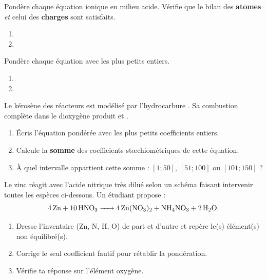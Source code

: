 \documentclass[11pt,a4paper]{article}
\begin{document}
\begin{exo}
Pondère chaque équation ionique en milieu acide. Vérifie que le bilan des \textbf{atomes} \emph{et}
celui des \textbf{charges} sont satisfaits.
\begin{enumerate}[label=\alph*)]
  \item {}
  \item {}
\end{enumerate}
\end{exo}

\begin{exo}
Pondère chaque équation avec les plus petits entiers.
\begin{enumerate}[label=\alph*)]
  \item {}
  \item {}
\end{enumerate}
\end{exo}

\begin{exo}
Le kérosène des réacteurs est modélisé par l'hydrocarbure . Sa combustion complète dans le
dioxygène produit  et .
\begin{enumerate}[label=\alph*)]
  \item Écris l'équation pondérée avec les plus petits coefficients entiers.
  \item Calcule la \textbf{somme} des coefficients stœchiométriques de cette équation.
  \item À quel intervalle appartient cette somme : $[1;50]$, $[51;100]$ ou $[101;150]$ ?
\end{enumerate}
\end{exo}

\begin{exo}
Le zinc réagit avec l'acide nitrique très dilué selon un schéma faisant intervenir toutes les
espèces ci-dessous. Un étudiant propose :
\[
\ce{4 Zn + 10 HNO3 -> 4 Zn(NO3)2 + NH4NO3 + 2 H2O}.
\]
\begin{enumerate}[label=\alph*)]
  \item Dresse l'inventaire (Zn, N, H, O) de part et d'autre et repère le(s) élément(s) non
        équilibré(s).
  \item Corrige le seul coefficient fautif pour rétablir la pondération.
  \item Vérifie ta réponse sur l'élément oxygène.
\end{enumerate}
\end{exo}
\end{document}
